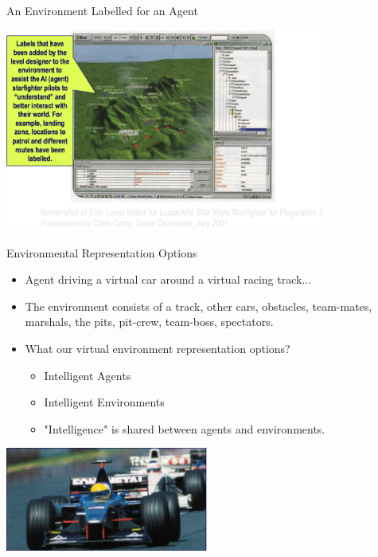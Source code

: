\documentclass[aspectratio=1610,xcolor=dvipsnames,t]{beamer}
\begin{document}
\begin{frame}{An Environment Labelled for an Agent}
    \begin{center}
        \includegraphics[width=0.8\textwidth]{eve} 
    \end{center}
\end{frame} 

\begin{frame}{Environmental Representation Options} 
    \begin{itemize}
        \item Agent driving a virtual car around a virtual racing track...
        \item The environment consists of a track, other cars,
              obstacles, team-mates, marshals, the pits, pit-crew,
              team-boss, spectators.
        \item What our virtual environment representation options?
            \begin{itemize}
                \item Intelligent Agents
                \item Intelligent Environments
                \item "Intelligence" is shared between agents and environments.
            \end{itemize}
    \end{itemize}
    \begin{center}
        \includegraphics[width=0.5\textwidth]{formula1} 
    \end{center}
\end{frame} 
\end{document}
